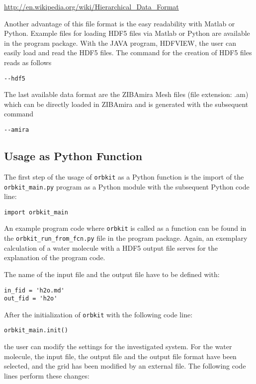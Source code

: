 \documentclass[a4paper,10pt]{scrartcl}
\begin{document}
\url{http://en.wikipedia.org/wiki/Hierarchical_Data_Format}

Another advantage of this file format is the easy readability with
Matlab or Python. Example files for loading HDF5 files via Matlab
or Python are available in the program package. With the JAVA program,
HDFVIEW, the user can easily load and read the HDF5 files. The command
for the creation of HDF5 files reads as follows

\begin{verbatim}
--hdf5
\end{verbatim}


The last available data format are the ZIBAmira Mesh files (file extension:
.am) which can be directly loaded in ZIBAmira and is generated with
the subsequent command 

\begin{verbatim}
--amira
\end{verbatim}



\subsection{Usage as Python Function}

The first step of the usage of \texttt{orbkit} as a Python function is the
import of the \verb!orbkit_main.py! program as a Python module with the subsequent
Python code line:

\begin{verbatim}
import orbkit_main
\end{verbatim}


An example program code where \texttt{orbkit} is called as a function can
be found in the \verb!orbkit_run_from_fcn.py! file in the program package.
Again, an exemplary calculation of a water molecule with a HDF5 output
file serves for the explanation of the program code.

The name of the input file and the output file have to be defined
with:

\begin{verbatim}
in_fid = 'h2o.md'
out_fid = 'h2o'
\end{verbatim}


After the initialization of \texttt{orbkit} with the following code line:

\begin{verbatim}
orbkit_main.init()
\end{verbatim}


the user can modify the settings for the investigated system. For
the water molecule, the input file, the output file and the output
file format have been selected, and the grid has been modified by
an external file. The following code lines perform these changes:
\end{document}
